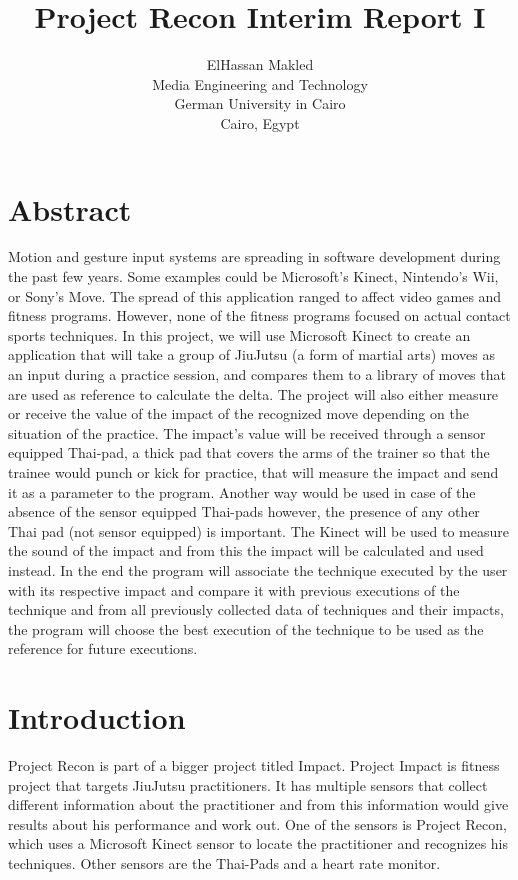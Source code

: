 \documentclass[11pt]{article} %
\title{Project Recon Interim Report I}
\author{ElHassan Makled\\Media Engineering and Technology\\ German University in Cairo\\ Cairo, Egypt}
\begin{document}
\maketitle
\pagebreak
\section{Abstract}
Motion and gesture input systems are spreading in software development during the past few years. Some examples could be Microsoft's Kinect, Nintendo's Wii, or Sony's Move. 
The spread of this application ranged to affect video games and fitness programs. However, none of the fitness programs focused on actual contact sports techniques. 
In this project, we will use Microsoft Kinect to create an application that will take a group of JiuJutsu (a form of martial arts) moves as an input during a practice session, 
and compares them to a library of moves that are used as reference to calculate the delta. 
The project will also either measure or receive the value of the impact of the recognized move depending on the
situation of the practice. The impact's value will be received through a sensor equipped Thai-pad, a thick pad that covers the arms of the trainer so that the trainee would punch or kick for practice, that will measure the impact and send it as a parameter to the program. Another way would be used in case of the absence of the sensor equipped Thai-pads however, the presence of any other Thai pad (not sensor equipped) is important. The Kinect will be used to measure the sound of the impact and from this the impact will be calculated and used instead. In the end the program will associate the technique executed by the user with its respective impact and compare it with previous executions of the technique and from all previously collected data of techniques and their impacts, the program will choose the best execution of the technique to be used as the reference for future executions.
\section{Introduction}
Project Recon is part of a bigger project titled Impact. Project Impact is fitness project that targets JiuJutsu practitioners. It has multiple sensors that collect different information about the practitioner and from this information would give results about his performance and work out. One of the sensors is Project Recon, which uses a Microsoft Kinect sensor to locate the practitioner and recognizes his techniques. Other sensors are the Thai-Pads and a heart rate monitor.
\end{document}
